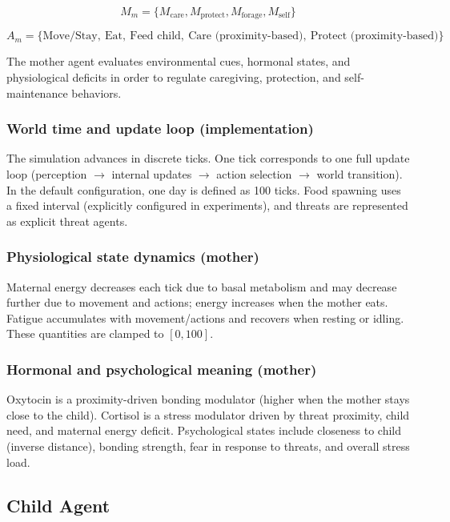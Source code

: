 \[
M_m =
\{
M_{\text{care}},
M_{\text{protect}},
M_{\text{forage}},
M_{\text{self}}
\}
\]


\[
A_m =
\{
\text{Move/Stay},\ \allowbreak
\text{Eat},\ \allowbreak
\text{Feed child},\ \allowbreak
\text{Care (proximity-based)},\ \allowbreak
\text{Protect (proximity-based)}
\}
\]

The mother agent evaluates environmental cues, hormonal states,
and physiological deficits in order to regulate caregiving,
protection, and self-maintenance behaviors.

\subsubsection{World time and update loop (implementation)}
The simulation advances in discrete ticks. One tick corresponds to one full update loop (perception $\rightarrow$ internal updates $\rightarrow$ action selection $\rightarrow$ world transition). In the default configuration, one day is defined as 100 ticks. Food spawning uses a fixed interval (explicitly configured in experiments), and threats are represented as explicit threat agents.

\subsubsection{Physiological state dynamics (mother)}
Maternal energy decreases each tick due to basal metabolism and may decrease further due to movement and actions; energy increases when the mother eats. Fatigue accumulates with movement/actions and recovers when resting or idling. These quantities are clamped to $[0,100]$.

\subsubsection{Hormonal and psychological meaning (mother)}
Oxytocin is a proximity-driven bonding modulator (higher when the mother stays close to the child). Cortisol is a stress modulator driven by threat proximity, child need, and maternal energy deficit. Psychological states include closeness to child (inverse distance), bonding strength, fear in response to threats, and overall stress load.




\subsection{Child Agent}

